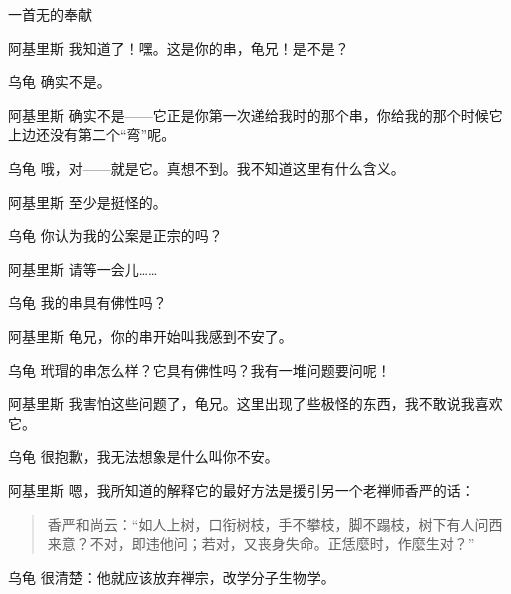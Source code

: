 \begin{dialog}{一首无的奉献\label{abcd}}
\begin{dialogue}
\item[阿基里斯]我知道了！嘿。这是你的串，龟兄！是不是？

\item[乌龟]确实不是。

\item[阿基里斯]确实不是——它正是你第一次递给我时的那个串，你给我的那个时候它上边还没有第二个“弯”呢。

\item[乌龟]哦，对——就是它。真想不到。我不知道这里有什么含义。

\item[阿基里斯]至少是挺怪的。

\item[乌龟]你认为我的公案是正宗的吗？

\item[阿基里斯]请等一会儿……

\item[乌龟]我的串具有佛性吗？

\item[阿基里斯]龟兄，你的串开始叫我感到不安了。

\item[乌龟]玳瑁的串怎么样？它具有佛性吗？我有一堆问题要问呢！

\item[阿基里斯]我害怕这些问题了，龟兄。这里出现了些极怪的东西，我不敢说我喜欢它。

\item[乌龟]很抱歉，我无法想象是什么叫你不安。

\item[阿基里斯]嗯，我所知道的解释它的最好方法是援引另一个老禅师香严的话：
  \begin{quote}
  香严和尚云：“如人上树，口衔树枝，手不攀枝，脚不蹋枝，树下有人问西来意？不对，即违他问；若对，又丧身失命。正恁麼时，作麼生对？”
  \end{quote}

\item[乌龟]很清楚：他就应该放弃禅宗，改学分子生物学。

\end{dialogue}

\end{dialog}
